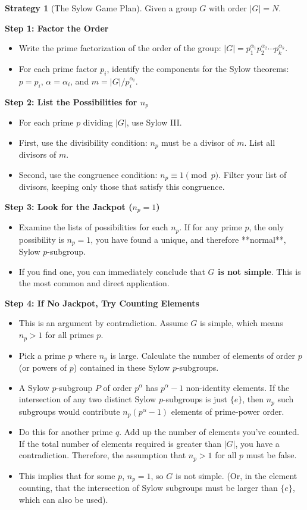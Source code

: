 \documentclass[12pt,a4paper]{article}
\theoremstyle{plain} %
\theoremstyle{definition} %
\newtheorem{strategy}[theorem]{Strategy}
\theoremstyle{remark} %
\begin{document}
\begin{strategy}[The Sylow Game Plan]
Given a group $G$ with order $|G|=N$.

\textbf{Step 1: Factor the Order}
\begin{itemize}
    \item Write the prime factorization of the order of the group: $|G| = p_1^{\alpha_1} p_2^{\alpha_2} \cdots p_k^{\alpha_k}$.
    \item For each prime factor $p_i$, identify the components for the Sylow theorems: $p=p_i$, $\alpha=\alpha_i$, and $m = |G|/p_i^{\alpha_i}$.
\end{itemize}

\textbf{Step 2: List the Possibilities for $n_p$}
\begin{itemize}
    \item For each prime $p$ dividing $|G|$, use Sylow III.
    \item First, use the divisibility condition: $n_p$ must be a divisor of $m$. List all divisors of $m$.
    \item Second, use the congruence condition: $n_p \equiv 1 \pmod{p}$. Filter your list of divisors, keeping only those that satisfy this congruence.
\end{itemize}

\textbf{Step 3: Look for the Jackpot ($n_p=1$)}
\begin{itemize}
    \item Examine the lists of possibilities for each $n_p$. If for any prime $p$, the only possibility is $n_p=1$, you have found a unique, and therefore **normal**, Sylow $p$-subgroup.
    \item If you find one, you can immediately conclude that \textbf{$G$ is not simple}. This is the most common and direct application.
\end{itemize}

\textbf{Step 4: If No Jackpot, Try Counting Elements}
\begin{itemize}
    \item This is an argument by contradiction. Assume $G$ is simple, which means $n_p > 1$ for all primes $p$.
    \item Pick a prime $p$ where $n_p$ is large. Calculate the number of elements of order $p$ (or powers of $p$) contained in these Sylow $p$-subgroups.
    \item A Sylow $p$-subgroup $P$ of order $p^\alpha$ has $p^\alpha-1$ non-identity elements. If the intersection of any two distinct Sylow $p$-subgroups is just $\{e\}$, then $n_p$ such subgroups would contribute $n_p(p^\alpha-1)$ elements of prime-power order.
    \item Do this for another prime $q$. Add up the number of elements you've counted. If the total number of elements required is greater than $|G|$, you have a contradiction. Therefore, the assumption that $n_p > 1$ for all $p$ must be false.
    \item This implies that for some $p$, $n_p=1$, so $G$ is not simple. (Or, in the element counting, that the intersection of Sylow subgroups must be larger than $\{e\}$, which can also be used).
\end{itemize}


\end{strategy}
\end{document}
